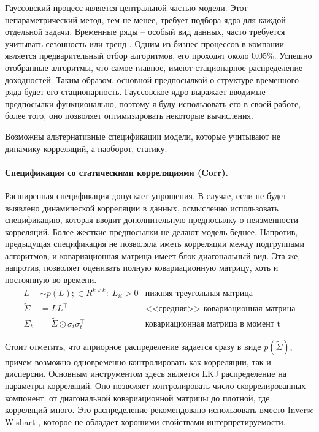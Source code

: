 Гауссовский процесс является центральной частью модели. Этот непараметрический метод, тем не менее, требует подбора ядра для каждой отдельной задачи. Временные ряды -- особый вид данных, часто требуется учитывать сезонность или тренд \citep{taylor2017}. Одним из бизнес процессов в компании является предварительный отбор алгоритмов, его проходят около 0.05\%. Успешно отобранные алгоритмы, что самое главное, имеют стационарное распределение доходностей. Таким образом, основной предпосылкой о структуре временного ряда будет его стационарность. Гауссовское ядро выражает вводимые предпосылки функционально, поэтому я буду использовать его в своей работе, более того, оно позволяет оптимизировать некоторые вычисления. 

Возможны альтернативные спецификации модели, которые учитывают не динамику корреляций, а наоборот, статику.
\paragraph{Спецификация со статическими корреляциями (Corr).}
Расширенная спецификация допускает упрощения. В случае, если не будет выявлено динамической корреляции в данных, осмысленно использовать спецификацию, которая вводит дополнительную предпосылку о неизменности корреляций. Более жесткие предпосылки не делают модель беднее. Напротив, предыдущая спецификация не позволяла иметь корреляции между подгруппами алгоритмов, и ковариационная матрица имеет блок диагональный вид. Эта же, напротив, позволяет оценивать полную ковариационную матрицу, хоть и постоянную во времени.
\begin{align}
L &\sim p(L);\in R^{k\times k}:\; L_{ii} > 0 & \text{нижняя треугольная матрица}\nonumber\\
\tilde{\Sigma} &= LL^\top & \text{<<средняя>> ковариационная матрица}\nonumber\\
\Sigma_t &= \tilde{\Sigma} \odot \sigma_t\sigma_t^\top & \text{ковариационная матрица в момент t}\label{eq:staticcorr}
\end{align}

Стоит отметить, что априорное распределение задается сразу в виде $p(\tilde{\Sigma})$, причем возможно одновременно контролировать как корреляции, так и дисперсии. Основным инструментом здесь является LKJ распределение \citep{lewandowski2009} на параметры корреляций. Оно позволяет контролировать число скоррелированных компонент: от диагональной ковариационной матрицы до плотной, где корреляций много. Это распределение рекомендовано использовать вместо Inverse Wishart \citep{haff1979}, которое не обладает хорошими свойствами интерпретируемости. 


